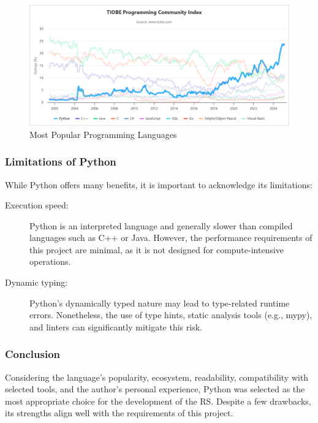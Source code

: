 \begin{figure}[!htbp]
  \centering
  \includegraphics[width=\linewidth]{images/rating-language}
  \caption{Most Popular Programming Languages~\cite{ratingLanguage}}
  \label{fig:pythonRating}
\end{figure}

\newpage
\subsubsection{Limitations of Python}

While Python offers many benefits, it is important to acknowledge its limitations:
\begin{description}
  \item [Execution speed:] Python is an interpreted language and generally slower than compiled languages such as C++ or Java. However, the performance requirements of this project are minimal, as it is not designed for compute-intensive operations.
  \item [Dynamic typing:] Python’s dynamically typed nature may lead to type-related runtime errors. Nonetheless, the use of type hints, static analysis tools (e.g., mypy), and linters can significantly mitigate this risk.
\end{description}

\subsubsection{Conclusion}

Considering the language’s popularity, ecosystem, readability, compatibility with selected tools, and the author’s personal experience, Python was selected as the most appropriate choice for the development of the RS. Despite a few drawbacks, its strengths align well with the requirements of this project.

